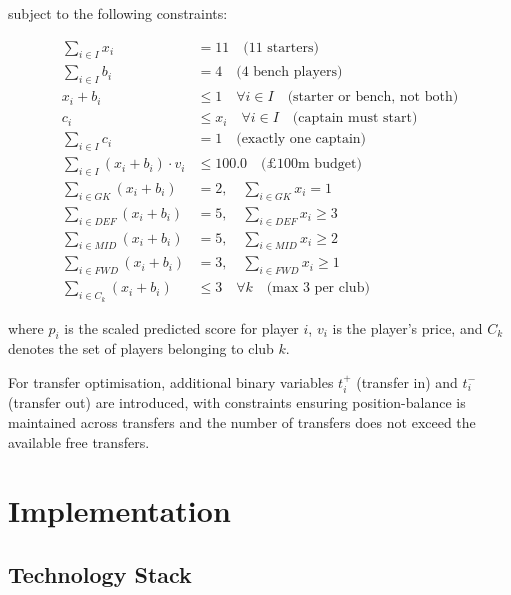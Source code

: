 \documentclass[11pt,english,listoffigures,listoftables]{tfgetsinf}
\begin{document}
subject to the following constraints:

\begin{align}
\sum_{i \in I} x_i &= 11 \quad \text{(11 starters)} \\
\sum_{i \in I} b_i &= 4 \quad \text{(4 bench players)} \\
x_i + b_i &\leq 1 \quad \forall i \in I \quad \text{(starter or bench, not both)} \\
c_i &\leq x_i \quad \forall i \in I \quad \text{(captain must start)} \\
\sum_{i \in I} c_i &= 1 \quad \text{(exactly one captain)} \\
\sum_{i \in I} (x_i + b_i) \cdot v_i &\leq 100.0 \quad \text{(£100m budget)} \\
\sum_{i \in GK} (x_i + b_i) &= 2, \quad \sum_{i \in GK} x_i = 1 \\
\sum_{i \in DEF} (x_i + b_i) &= 5, \quad \sum_{i \in DEF} x_i \geq 3 \\
\sum_{i \in MID} (x_i + b_i) &= 5, \quad \sum_{i \in MID} x_i \geq 2 \\
\sum_{i \in FWD} (x_i + b_i) &= 3, \quad \sum_{i \in FWD} x_i \geq 1 \\
\sum_{i \in C_k} (x_i + b_i) &\leq 3 \quad \forall k \quad \text{(max 3 per club)}
\end{align}

where $\hat{p}_i$ is the scaled predicted score for player $i$, $v_i$ is the player's price, and $C_k$ denotes the set of players belonging to club $k$.

For transfer optimisation, additional binary variables $t^+_i$ (transfer in) and $t^-_i$ (transfer out) are introduced, with constraints ensuring position-balance is maintained across transfers and the number of transfers does not exceed the available free transfers.


\chapter{Implementation}
\label{chap:development}

\section{Technology Stack}
\end{document}
